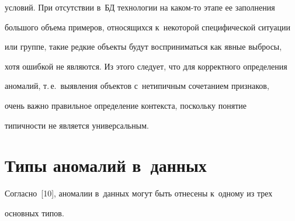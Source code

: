 \begin{enumerate}[1.]
условий. При отсутствии в~БД технологии на каком-то этапе ее заполнения 


большого объема примеров, относящихся к~некоторой специфической ситуации 


или группе, такие редкие объекты будут восприниматься как явные выбросы, 


хотя ошибкой не являются. Из этого следует, что для корректного определения 


аномалий, т.\,е.\ выявления объектов с~нетипичным сочетанием признаков, 


очень важно правильное определение контекста, поскольку понятие 


типичности не является универсальным.


  \end{enumerate}


  


\section{Типы аномалий в~данных}





  Согласно~[10], аномалии в~данных могут быть отнесены к~одному из трех 


основных типов.


